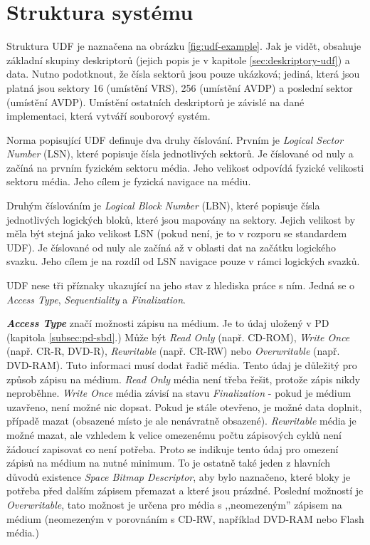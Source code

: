 \section{Struktura systému}
\label{sec:udf-struktura}
Struktura UDF je naznačena na obrázku \ref{fig:udf-example}. Jak je vidět, obsahuje základní skupiny deskriptorů (jejich popis je v kapitole \ref{sec:deskriptory-udf}) a data. Nutno podotknout, že čísla sektorů jsou pouze ukázková; jediná, která jsou platná jsou sektory 16 (umístění VRS), 256 (umístění AVDP) a poslední sektor (umístění AVDP). Umístění ostatních deskriptorů je závislé na dané implementaci, která vytváří souborový systém.
 
Norma popisující UDF definuje dva druhy číslování. Prvním je \textit{Logical Sector Number} (LSN), které popisuje čísla jednotlivých sektorů. Je číslované od nuly a začíná na prvním fyzickém sektoru média. Jeho velikost odpovídá fyzické velikosti sektoru média. Jeho cílem je fyzická navigace na médiu.

Druhým číslováním je \textit{Logical Block Number} (LBN), které popisuje čísla jednotlivých logických bloků, které jsou mapovány na sektory. Jejich velikost by měla být stejná jako velikost LSN (pokud není, je to v rozporu se standardem UDF). Je číslované od nuly ale začíná až v oblasti dat na začátku logického svazku. Jeho cílem je na rozdíl od LSN navigace pouze v rámci logických svazků.

UDF nese tři příznaky ukazující na jeho stav z hlediska práce s ním. Jedná se o \textit{Access Type}, \textit{Sequentiality} a \textit{Finalization}.

\textbf{\textit{Access Type}} značí možnosti zápisu na médium. Je to údaj uložený v PD (kapitola \ref{subsec:pd-sbd}.) Může být \textit{Read Only} (např. CD-ROM), \textit{Write Once} (např. CR-R, DVD-R), \textit{Rewritable} (např. CR-RW) nebo \textit{Overwritable} (např. DVD-RAM). Tuto informaci musí dodat řadič média. Tento údaj je důležitý pro způsob zápisu na médium. \textit{Read Only} média není třeba řešit, protože zápis nikdy neproběhne. \textit{Write Once} média závisí na stavu \textit{Finalization} - pokud je médium uzavřeno, není možné nic dopsat. Pokud je stále otevřeno, je možné data doplnit, případě mazat (obsazené místo je ale nenávratně obsazené). \textit{Rewritable} média je možné mazat, ale vzhledem k velice omezenému počtu zápisových cyklů není žádoucí zapisovat co není potřeba. Proto se indikuje tento údaj pro omezení zápisů na médium na nutné minimum. To je ostatně také jeden z hlavních důvodů existence \textit{Space Bitmap Descriptor}, aby bylo naznačeno, které bloky je potřeba před dalším zápisem přemazat a které jsou prázdné. Poslední možností je \textit{Overwritable}, tato možnost je určena pro média s ,,neomezeným'' zápisem na médium (neomezeným v porovnáním s CD-RW, například DVD-RAM nebo Flash média.)

